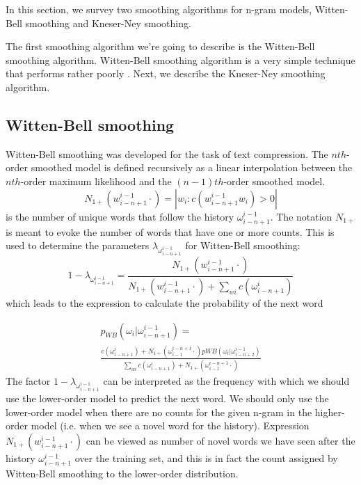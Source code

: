 \documentclass[10pt, a4paper]{article}
\begin{document}
In this section, we survey two smoothing algorithms for n-gram models, Witten-Bell smoothing and Kneser-Ney smoothing. 

The first smoothing algorithm we\rq{}re going to describe is the Witten-Bell smoothing algorithm. Witten-Bell smoothing algorithm is a very simple technique that performs rather poorly \citep{1_chen1999empirical}. Next, we describe the Kneser-Ney smoothing algorithm. 

\subsection{Witten-Bell smoothing}
Witten-Bell smoothing was developed for the task of text compression. The $nth$-order smoothed model is defined recursively as a linear interpolation between the $nth$-order maximum likelihood and the $(n-1)th$-order smoothed model. 
\begin{equation}
N_{1+}(w_{i-n+1}^{i-1}\cdot) = |{w_{i} : c(w_{i-n+1}^{i-1}w_{i}) > 0}|
\end{equation}
is the number of unique words that follow the history $ \omega_{i-n+1}^{i-1} $.
The notation $N_{1+}$ is meant to evoke the number of words that have one or more counts.
This is used to determine the parameters $ \lambda_{\omega_{i-n+1}^{i-1}} $  for Witten-Bell smoothing:
\begin{equation}
1-\lambda_{\omega_{i-n+1}^{i-1}}=\frac{N_{1+}(w_{i-n+1}^{i-1}\cdot)}{N_{1+}(w_{i-n+1}^{i-1}\cdot) + \sum_{wi}c(\omega_{i-n+1}^{i})}
\end{equation}
which leads to the expression to calculate the probability of the next word 

\begin{multline}
p_{WB}(\omega_i|\omega_{i-n+1}^{i-1})= \\ \frac{c(\omega_{i-n+1}^{i}) + N_{1+}(\omega_{i-1}^{i-n+1}\cdot)p{WB}(\omega_i|\omega_{i-n+2}^{i-1})}{\sum_{wi}c(\omega_{i-n+1}^{i}) + N_{1+}(\omega_{i-1}^{i-n+1}\cdot)}
\end{multline}
The factor $ 1-\lambda_{\omega_{i-n+1}^{i-1}} $ can be interpreted as the frequency with which we should use the lower-order model to predict the next word. We should only use the lower-order model when there are no counts for the given n-gram in the higher-order model (i.e. when we see a novel word for the history). Expression $ N_{1+}(w_{i-n+1}^{i-1}\cdot) $ can be viewed as number of novel words we have seen after the history $ \omega_{i-n+1}^{i-1} $ over the training set, and this is in fact the count assigned by Witten-Bell smoothing to the lower-order distribution.
\end{document}
